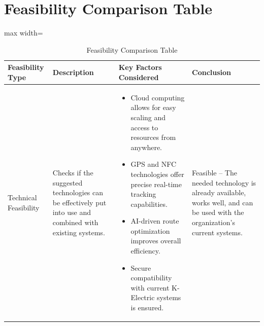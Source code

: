 
\cleardoublepage
\appendix
{}  %

\chapter{Feasibility Comparison Table}  %

\begin{table}[htbp]
    \centering
    \caption{Feasibility Comparison Table}
    \label{tab:feasibility}
    \vspace{1em}  %
    \small  %
    \begin{adjustbox}{max width=\textwidth}  %
        \begin{tabular}{>{\raggedright\arraybackslash}p{3.2cm} >{\raggedright\arraybackslash}p{4.2cm} >{\raggedright\arraybackslash}p{6cm} >{\raggedright\arraybackslash}p{3.4cm}}
            \toprule
            \textbf{Feasibility Type} & \textbf{Description} & \textbf{Key Factors Considered} & \textbf{Conclusion} \\
            \midrule
            Technical Feasibility
            & Checks if the suggested technologies can be effectively put into use and combined with existing systems.
            & \begin{itemize}[nosep, left=1em, wide=0pt]
                \item Cloud computing allows for easy scaling and access to resources from anywhere.
                \item GPS and NFC technologies offer precise real-time tracking capabilities.
                \item AI-driven route optimization improves overall efficiency.
                \item Secure compatibility with current K-Electric systems is ensured.
            \end{itemize}
            & Feasible – The needed technology is already available, works well, and can be used with the organization's current systems. \\[8pt]
            

\end{tabular}
\end{adjustbox}
\end{table}
